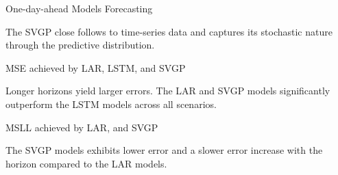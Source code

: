 \begin{frame}{One-day-ahead Models Forecasting}
	\centering
	\begin{figure}[htbp]
		\tiny
		\setlength{} 
		\setlength{}
		
		\subfloat[Reservoir $A$]{}
		\subfloat[Reservoir $I$]{}
	\end{figure}
	\vspace{-1.5em}
	\begin{block}{}
	 The SVGP close follows to time-series data and captures its stochastic nature through the predictive distribution.
	\end{block}
\end{frame}


\begin{frame}{MSE achieved by LAR, LSTM, and SVGP}
	\begin{figure}[htbp]
		\centering 
		\tiny
		\setlength{} 
		\setlength{}
		\subfloat[LAR.]{}\hspace{-1.5em}
		\subfloat[LSTM.]{}\hspace{-1.5em}
		\subfloat[SVGP.]{}
	\end{figure}
	\vspace{-1.5em}
	\begin{block}{}
 Longer horizons yield larger errors. The LAR and SVGP models significantly outperform the LSTM models across all scenarios.
	\end{block}
\end{frame}

\begin{frame}{MSLL achieved by LAR, and SVGP}
	\begin{figure}[htbp]
		\centering
		\tiny
		\setlength{} 
		\setlength{}
		\subfloat[LAR.]{}\hspace{-1.5em}
		\subfloat[SVGP.]{}
	\end{figure}
	\vspace{-1.8em}
	\begin{block}{}
	The SVGP models exhibits lower error and a slower error increase with the horizon compared to the LAR models.
	\end{block}
\end{frame}

